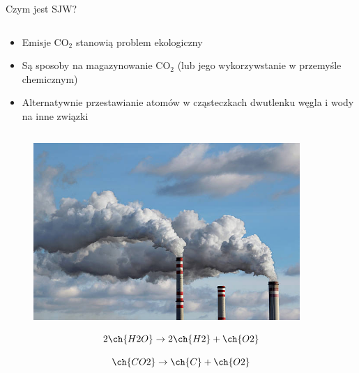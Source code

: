 \begin{columnframe}{Czym jest SJW?}
    \begin{column}{0.5\textwidth}
        \begin{itemize}
            \item Emisje CO$_2$ stanowią problem ekologiczny
            \item Są sposoby na magazynowanie CO$_2$ (lub jego wykorzywstanie w przemyśle chemicznym)
            \item Alternatywnie przestawianie atomów w cząsteczkach dwutlenku węgla i wody na inne związki
        \end{itemize}
    \end{column}
    \begin{column}{0.5\textwidth}
        \begin{figure}
            \centering
            \includegraphics[width=0.9\textwidth, frame]{images/industrial_polution_stock_image.jpg}
        \end{figure}

        \begin{equation*}
            2\ch{H2O} \rightarrow 2\ch{H2} + \ch{O2}
        \end{equation*}

        \begin{equation*}
            \ch{CO2} \rightarrow \ch{C} + \ch{O2}
        \end{equation*}
    \end{column}
\end{columnframe}

